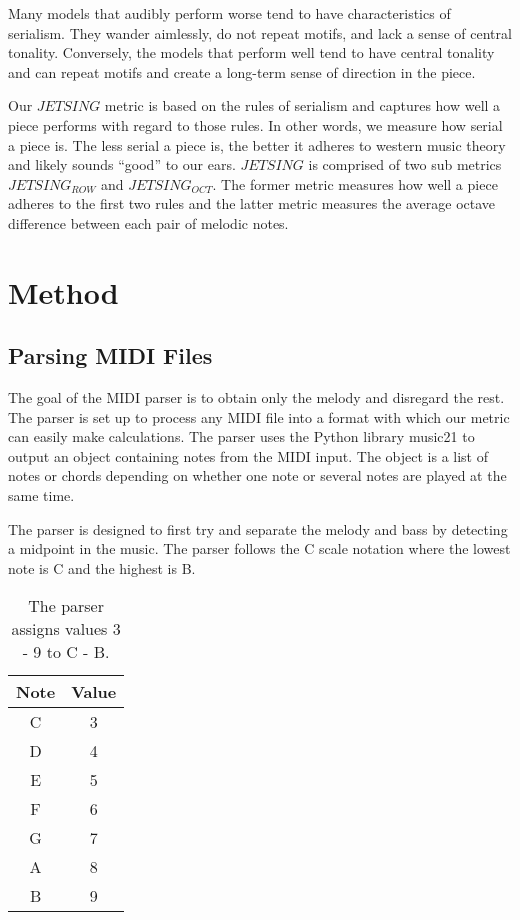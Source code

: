 \documentclass[11pt]{article}
\begin{document}
Many models that audibly perform worse tend to have characteristics of serialism.
They wander aimlessly, do not repeat motifs, and lack a sense of central tonality.
Conversely, the models that perform well tend to have central tonality and can repeat motifs and create a long-term sense of direction in the piece.

Our $JETSING$ metric is based on the rules of serialism and captures how well a piece performs with regard to those rules.
In other words, we measure how serial a piece is.
The less serial a piece is, the better it adheres to western music theory and likely sounds “good” to our ears.
$JETSING$ is comprised of two sub metrics $JETSING_{ROW}$ and $JETSING_{OCT}$.
The former metric measures how well a piece adheres to the first two rules and the latter metric measures the average octave difference between each pair of melodic notes.

\section{Method}
\subsection{Parsing MIDI Files}

The goal of the MIDI parser is to obtain only the melody and disregard the rest.
The parser is set up to process any MIDI file into a format with which our metric can easily make calculations.
The parser uses the Python library music21 to output an object containing notes from the MIDI input.
The object is a list of notes or chords depending on whether one note or several notes are played at the same time.

The parser is designed to first try and separate the melody and bass by detecting a midpoint in the music.
The parser follows the C scale notation where the lowest note is C and the highest is B.

\begin{table}
    \centering
    \begin{tabular}{c c}
        \hline
        Note & Value \\
        \hline
        C & 3 \\
        \hline
        D & 4 \\
        \hline
        E & 5 \\
        \hline
        F & 6 \\
        \hline
        G & 7 \\
        \hline
        A & 8 \\
        \hline
        B & 9 \\
        \hline
    \end{tabular}
    \caption{The parser assigns values 3 - 9 to C - B.}
\end{table}
\end{document}
